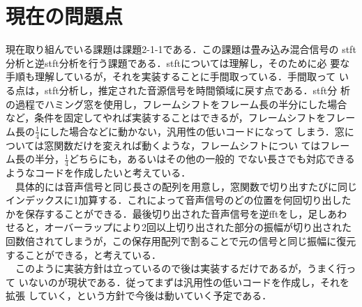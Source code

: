 \documentclass[a4j]{jarticle}
\begin{document}
\section*{現在の問題点}
現在取り組んでいる課題は課題2-1-1である．この課題は畳み込み混合信号の
stft分析と逆stft分析を行う課題である．stftについては理解し，そのために必
要な手順も理解しているが，それを実装することに手間取っている．手間取って
いる点は，stft分析し，推定された音源信号を時間領域に戻す点である．stft分
析の過程でハミング窓を使用し，フレームシフトをフレーム長の半分にした場合
など，条件を固定してやれば実装することはできるが，フレームシフトをフレー
ム長の$\frac{1}{4}$にした場合などに動かない，汎用性の低いコードになって
しまう．窓については窓関数だけを変えれば動くような，フレームシフトについ
てはフレーム長の半分，$\frac{1}{4}$どちらにも，あるいはその他の一般的
でない長さでも対応できるようなコードを作成したいと考えている．\\\ \ 
具体的には音声信号と同じ長さの配列を用意し，窓関数で切り出すたびに同じ
インデックスに1加算する．これによって音声信号のどの位置を何回切り出した
かを保存することができる．最後切り出された音声信号を逆fftをし，足しあわ
せると，オーバーラップにより2回以上切り出された部分の振幅が切り出された
回数倍されてしまうが，この保存用配列で割ることで元の信号と同じ振幅に復元
することができる，と考えている．\\ \ \ 
このように実装方針は立っているので後は実装するだけであるが，うまく行って
いないのが現状である．従ってまずは汎用性の低いコードを作成し，それを拡張
していく，という方針で今後は動いていく予定である．
\end{document}
